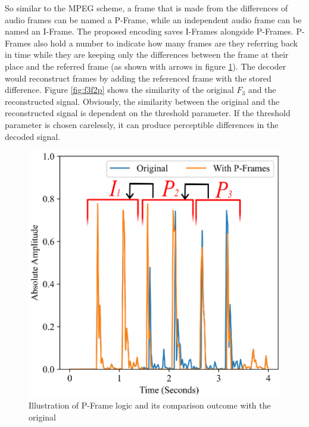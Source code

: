 So similar to the MPEG scheme, a frame that is made from the differences of audio frames can be named a P-Frame, while an independent audio frame can be named an I-Frame. The proposed encoding saves I-Frames alongside P-Frames. P-Frames also hold a number to indicate how many frames are they referring back in time while they are keeping only the differences between the frame at their place and the referred frame (as shown with arrows in figure \ref{fig:ipp}). The decoder would reconstruct frames by adding the referenced frame with the stored difference. Figure \ref{fig:f3f2p} shows the similarity of the original $F_3$ and the reconstructed signal. Obviously, the similarity between the original and the reconstructed signal is dependent on the threshold parameter. If the threshold parameter is chosen carelessly, it can produce perceptible differences in the decoded signal.

\begin{figure}[ht] 
    \centering
    \includegraphics[width=0.5\linewidth, height=0.35\linewidth]{Figures/chap4/proposed/ipp.eps}
    \caption{Illustration of P-Frame logic and its comparison outcome with the original}
    \label{fig:ipp}
\end{figure}


